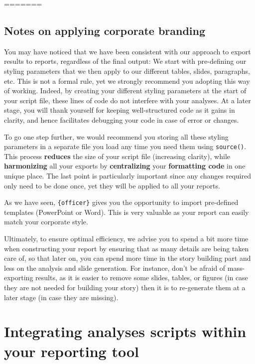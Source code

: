 \documentclass[
]{book}
\begin{document}
=======

\hypertarget{notes-on-applying-corporate-branding}{%
\subsection{Notes on applying corporate branding}\label{notes-on-applying-corporate-branding}}

You may have noticed that we have been consistent with our approach to export results to reports, regardless of the final output:
We start with pre-defining our styling parameters that we then apply to our different tables, slides, paragraphs, etc. This is not a formal rule, yet we strongly recommend you adopting this way of working. Indeed, by creating your different styling parameters at the start of your script file, these lines of code do not interfere with your analyses. At a later stage, you will thank yourself for keeping well-structured code as it gains in clarity, and hence facilitates debugging your code in case of error or changes.

To go one step further, we would recommend you storing all these styling parameters in a separate file you load any time you need them using \texttt{source()}. This process \textbf{reduces} the size of your script file (increasing clarity), while \textbf{harmonizing} all your exports by \textbf{centralizing} your \textbf{formatting code} in one unique place. The last point is particularly important since any changes required only need to be done once, yet they will be applied to all your reports.

As we have seen, \texttt{\{officer\}} gives you the opportunity to import pre-defined templates (PowerPoint or Word). This is very valuable as your report can easily match your corporate style.

Ultimately, to ensure optimal efficiency, we advise you to spend a bit more time when constructing your report by ensuring that as many details are being taken care of, so that later on, you can spend more time in the story building part and less on the analysis and slide generation. For instance, don't be afraid of mass-exporting results, as it is easier to remove some slides, tables, or figures (in case they are not needed for building your story) then it is to re-generate them at a later stage (in case they are missing).

\hypertarget{integrating-analyses-scripts-within-your-reporting-tool}{%
\section{Integrating analyses scripts within your reporting tool}\label{integrating-analyses-scripts-within-your-reporting-tool}}
\end{document}
